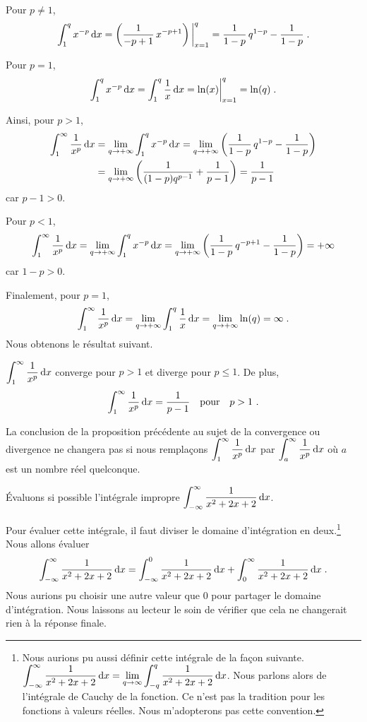 {Pour $p\neq 1$,
\[
\int_1^q x^{-p} \,\mathrm{d}x
= \left( \frac{1}{-p+1} \, x^{-p+1} \right)\bigg|_{x=1}^q
= \frac{1}{1-p} \, q^{1-p} - \frac{1}{1-p} \; .
\]

Pour $p=1$,
\[
\int_1^q x^{-p} \,\mathrm{d}x = \int_1^q \frac{1}{x} \,\mathrm{d}x
= \ln(x)\bigg|_{x=1}^q = \ln(q) \; .
\]

Ainsi, pour $p>1$,
\begin{align*}
\int_1^\infty \frac{1}{x^p} \,\mathrm{d}x
&= \lim_{q\rightarrow +\infty} \int_1^q x^{-p} \,\mathrm{d}x
= \lim_{q\rightarrow +\infty}
\left( \frac{1}{1-p} \, q^{1-p} - \frac{1}{1-p} \right) \\
&= \lim_{q\rightarrow +\infty}
\left( \frac{1}{(1-p)q^{p-1}} + \frac{1}{p-1} \right)
= \frac{1}{p-1}
\end{align*}
car $p-1>0$.

Pour $p<1$,
\[
\int_1^\infty \frac{1}{x^p} \,\mathrm{d}x
= \lim_{q\rightarrow +\infty} \int_1^q x^{-p} \,\mathrm{d}x
= \lim_{q\rightarrow +\infty}
\left( \frac{1}{1-p} \, q^{-p+1} - \frac{1}{1-p} \right)
= +\infty
\]
car $1-p>0$.

Finalement, pour $p=1$,
\[
\int_1^\infty \frac{1}{x^p} \,\mathrm{d}x
= \lim_{q\rightarrow +\infty} \int_1^q \frac{1}{x} \,\mathrm{d}x
= \lim_{q\rightarrow +\infty} \ln(q) = \infty \; .
\]
Nous obtenons le résultat suivant.

\begin{prop} \label{impr_comp1}
$\displaystyle \int_1^\infty \frac{1}{x^p} \,\mathrm{d}x$ converge pour $p>1$
et diverge pour $p\leq 1$.  De plus,
\[
\int_1^\infty \frac{1}{x^p} \,\mathrm{d}x = \frac{1}{p-1} \quad \text{pour}
\quad p>1 \ .
\]
\end{prop}

La conclusion de la proposition précédente au sujet de la convergence
ou divergence ne changera pas si nous remplaçons
$\displaystyle \int_1^\infty \frac{1}{x^p} \,\mathrm{d}x$
par $\displaystyle \int_a^\infty \frac{1}{x^p} \,\mathrm{d}x$
où $a$ est un nombre réel quelconque.

\begin{egg}
Évaluons si possible l'intégrale impropre
$\displaystyle \int_{-\infty}^\infty \frac{1}{x^2+2x+2} \,\mathrm{d}x$.

Pour évaluer cette intégrale, il faut diviser le domaine d'intégration
en deux.\footnote{Nous aurions pu aussi définir cette intégrale de la
façon suivante.
$\displaystyle \int_{-\infty}^\infty \frac{1}{x^2+2x+2} \,\mathrm{d}x
= \lim_{q\to \infty} \int_{-q}^q \frac{1}{x^2+2x+2} \,\mathrm{d}x$.  Nous parlons
alors de l'intégrale de Cauchy de la fonction.  Ce n'est pas la
tradition pour les fonctions à valeurs réelles.  Nous m'adopterons pas
cette convention.}  Nous allons évaluer
\[
\int_{-\infty}^\infty \frac{1}{x^2+2x+2} \,\mathrm{d}x
= \int_{-\infty}^0 \frac{1}{x^2+2x+2} \,\mathrm{d}x
+ \int_0^\infty \frac{1}{x^2+2x+2} \,\mathrm{d}x \; .
\]
Nous aurions pu choisir une autre valeur que $0$ pour partager le domaine
d'intégration.  Nous laissons au lecteur le soin de vérifier que cela ne
changerait rien à la réponse finale.


\end{egg}}
